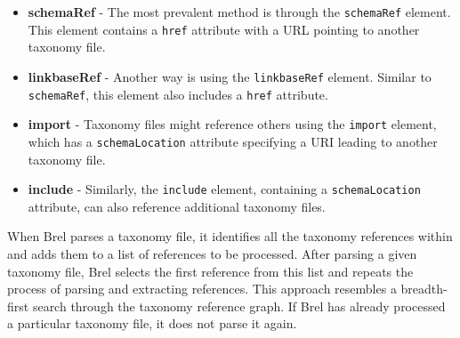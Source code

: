 \begin{itemize}
\item \textbf{schemaRef} - The most prevalent method is through the \texttt{schemaRef} element. 
This element contains a \texttt{href} attribute with a URL pointing to another taxonomy file.
\item \textbf{linkbaseRef} - Another way is using the \texttt{linkbaseRef} element. 
Similar to \texttt{schemaRef}, this element also includes a \texttt{href} attribute.
\item \textbf{import} - Taxonomy files might reference others using the \texttt{import} element, 
which has a \texttt{schemaLocation} attribute specifying a URI leading to another taxonomy file.
\item \textbf{include} - Similarly, the \texttt{include} element, 
containing a \texttt{schemaLocation} attribute, can also reference additional taxonomy files.
\end{itemize}

When Brel parses a taxonomy file, it identifies all the taxonomy references within and adds them to a list of references to be processed. 
After parsing a given taxonomy file, Brel selects the first reference from this list and repeats the process of parsing and extracting references. 
This approach resembles a breadth-first search through the taxonomy reference graph. 
If Brel has already processed a particular taxonomy file, it does not parse it again.




